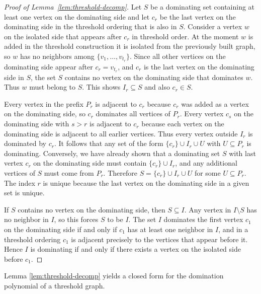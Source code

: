 \documentclass[11pt]{amsart}
\numberwithin{equation}{section}
\begin{document}
\begin{proof}[Proof of Lemma~\ref{lem:threshold-decomp}]
Let $S$ be a dominating set containing at least one vertex on the dominating side and let $c_r$ be the last vertex on the dominating side in the threshold ordering that is also in $S$. Consider a vertex $w$ on the isolated side that appears after $c_r$ in threshold order. At the moment $w$ is added in the threshold construction it is isolated from the previously built graph, so $w$ has no neighbors among $\{v_1,\dots,v_{t_r}\}$. Since all other vertices on the dominating side appear after $c_r=v_{t_r}$, and $c_r$ is the last vertex on the dominating side in $S$, the set $S$ contains no vertex on the dominating side that dominates $w$. Thus $w$ must belong to $S$. This shows $I_r\subseteq S$ and also $c_r\in S$.

Every vertex in the prefix $P_r$ is adjacent to $c_r$ because $c_r$ was added as a vertex on the dominating side, so $c_r$ dominates all vertices of $P_r$. Every vertex $c_s$ on the dominating side with $s>r$ is adjacent to $c_r$ because each vertex on the dominating side is adjacent to all earlier vertices. Thus every vertex outside $I_r$ is dominated by $c_r$. It follows that any set of the form $\{c_r\}\cup I_r\cup U$ with $U\subseteq P_r$ is dominating. Conversely, we have already shown that a dominating set $S$ with last vertex $c_r$ on the dominating side must contain $\{c_r\}\cup I_r$, and any additional vertices of $S$ must come from $P_r$. Therefore $S=\{c_r\}\cup I_r\cup U$ for some $U\subseteq P_r$. The index $r$ is unique because the last vertex on the dominating side in a given set is unique.

If $S$ contains no vertex on the dominating side, then $S\subseteq I$. Any vertex in $I\setminus S$ has no neighbor in $I$, so this forces $S$ to be $I$. The set $I$ dominates the first vertex $c_1$ on the dominating side if and only if $c_1$ has at least one neighbor in $I$, and in a threshold ordering $c_1$ is adjacent precisely to the vertices that appear before it. Hence $I$ is dominating if and only if there exists a vertex on the isolated side before $c_1$.
\end{proof}

Lemma \ref{lem:threshold-decomp} yields a closed form for the domination polynomial of a threshold graph.
\end{document}
